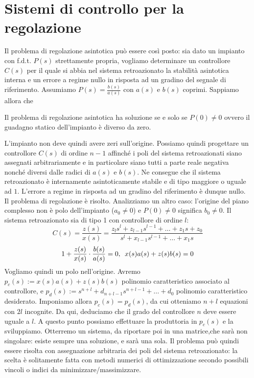 \documentclass[11pt]{article}
\begin{document}
\section{Sistemi di controllo per la regolazione}
Il problema di regolazione asintotica può essere così posto: sia dato un impianto con f.d.t. $P(s)$ strettamente propria, vogliamo determinare un controllore $C(s)$ per il quale si abbia nel sistema retroazionato la stabilità asintotica interna e un errore a regime nullo in risposta ad un gradino del segnale di riferimento.
Assumiamo $P(s)=\frac{b(s)}{a(s)}$ con $a(s)$ e $b(s)$ coprimi. Sappiamo allora che
\begin{center}
    Il problema di regolazione asintotica ha soluzione se e solo se $P(0)\neq0$ ovvero il guadagno statico dell'impianto è diverso da zero.
\end{center}
L'impianto non deve quindi avere zeri sull'origine. Possiamo quindi progettare un controllore $C(s)$ di ordine $n-1$ affinché i poli del sistema retroazionati siano assegnati arbitrariamente e in particolare siano tutti a parte reale negativa nonché diversi dalle radici di $a(s)$ e $b(s)$. Ne consegue che il sistema retroazionato è internamente asintoticamente stabile e di tipo maggiore o uguale ad $1$. L'errore a regime in risposta ad un gradino del riferimento è dunque nullo. Il problema di regolazione è risolto. Analizziamo un altro caso: l'origine del piano complesso non è polo dell'impianto ($a_0\neq 0$) e $P(0)\neq 0$ significa $b_0\neq0$. Il sistema retroazionato sia di tipo 1 con controllore di ordine $l$:
\begin{displaymath}
    C(s)=\frac{z(s)}{x(s)}=\frac{z_ls^l+z_{l-1}s^{l-1}+\dots+z_1s+z_0}{s^l+x_{l-1}s^{l-1}+\dots+x_1s}
\end{displaymath}
\begin{displaymath}
    1+\frac{z(s)}{x(s)}\cdot \frac{b(s)}{a(s)}=0,\hspace{5px}x(s)a(s)+z(s)b(s)=0
\end{displaymath}
Vogliamo quindi un polo nell'origine.
Avremo $p_c(s) := x(s)a(s)+z(s)b(s)$ polinomio caratteristico associato al controllore, e $p_d(s):=s^{n+l}+d_{n+l-1}s^{n+l-1}+\dots+d_0$ polinomio caratteristico desiderato. Imponiamo allora $p_c(s)=p_d(s)$, da cui otteniamo $n+l$ equazioni con $2l$ incognite.
Da qui, deduciamo che il grado del controllore $n$ deve essere uguale a $l$.
A questo punto possiamo effettuare la produttoria in $p_c(s)$ e la sviluppiamo. Otterremo un sistema, da riportare poi in una matrice,che sarà non singolare: esiste sempre una soluzione, e sarà una sola. Il problema può quindi essere risolta con assegnazione arbitraria dei poli del sistema retroazionato: la scelta è solitamente fatta con metodi numerici di ottimizzazione secondo possibili vincoli o indici da minimizzare/massimizzare.
\end{document}
